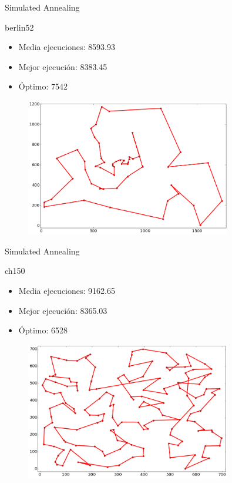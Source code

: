 \documentclass[ignorenonframetext,]{beamer}
\begin{document}
\begin{frame}{Simulated Annealing}

\begin{block}{berlin52}

\begin{itemize}
\item
  Media ejecuciones: 8593.93
\item
  Mejor ejecución: 8383.45
\item
  Óptimo: 7542
\end{itemize}

\begin{figure}[htbp]
\centering
\includegraphics[width=0.8\textwidth]{./images/berlin52sa.png}
\end{figure}

\end{block}

\end{frame}

\begin{frame}{Simulated Annealing}

\begin{block}{ch150}

\begin{itemize}
\item
  Media ejecuciones: 9162.65
\item
  Mejor ejecución: 8365.03
\item
  Óptimo: 6528
\end{itemize}

\begin{figure}[htbp]
\centering
\includegraphics[width=0.8\textwidth]{./images/ch150sa.png}
\end{figure}

\end{block}

\end{frame}
\end{document}
